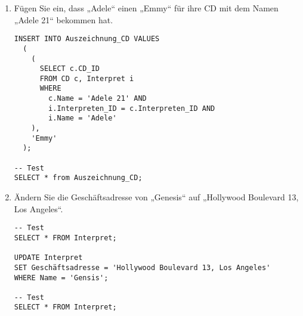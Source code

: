 \documentclass{lehramt-informatik-aufgabe}
\begin{document}
\begin{enumerate}

\item Fügen Sie ein, dass „Adele“ einen „Emmy“ für ihre CD mit dem Namen
„Adele 21“ bekommen hat.

\begin{liAntwort}
\begin{verbatim}
INSERT INTO Auszeichnung_CD VALUES
  (
    (
      SELECT c.CD_ID
      FROM CD c, Interpret i
      WHERE
        c.Name = 'Adele 21' AND
        i.Interpreten_ID = c.Interpreten_ID AND
        i.Name = 'Adele'
    ),
    'Emmy'
  );

-- Test
SELECT * from Auszeichnung_CD;
\end{verbatim}
\end{liAntwort}


\item Ändern Sie die Geschäftsadresse von „Genesis“ auf „Hollywood
Boulevard 13, Los Angeles“.

\begin{liAntwort}
\begin{verbatim}
-- Test
SELECT * FROM Interpret;

UPDATE Interpret
SET Geschäftsadresse = 'Hollywood Boulevard 13, Los Angeles'
WHERE Name = 'Gensis';

-- Test
SELECT * FROM Interpret;
\end{verbatim}
\end{liAntwort}

\end{enumerate}
\end{document}
